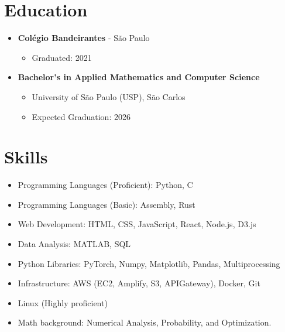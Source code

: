 \documentclass[a4paper,12pt]{article}
\begin{document}
\section*{Education}
\vspace{-0.5em}
\begin{itemize}[leftmargin=*, itemsep=-1.5pt]
  \item \textbf{Colégio Bandeirantes} - São Paulo
    \begin{itemize}[itemsep=-1pt]
      \item Graduated: 2021
    \end{itemize}
  \item \textbf{Bachelor's in Applied Mathematics and Computer Science}
    \begin{itemize}[itemsep=-1pt]
      \item University of São Paulo (USP), São Carlos
      \item Expected Graduation: 2026
    \end{itemize}
\end{itemize}
\vspace{-0.5em}

\section*{Skills}
\vspace{-0.5em}
\begin{itemize}[leftmargin=*, itemsep=-1.5pt]
  \item Programming Languages (Proficient): Python, C
  \item Programming Languages (Basic): Assembly, Rust
  \item Web Development: HTML, CSS, JavaScript, React, Node.js, D3.js
  \item Data Analysis: MATLAB, SQL
  \item Python Libraries: PyTorch, Numpy, Matplotlib, Pandas, Multiprocessing
  \item Infrastructure: AWS (EC2, Amplify, S3, APIGateway), Docker, Git
  \item Linux (Highly proficient)
  \item Math background: Numerical Analysis, Probability, and Optimization.
\end{itemize}
\vspace{-0.5em}
\end{document}
